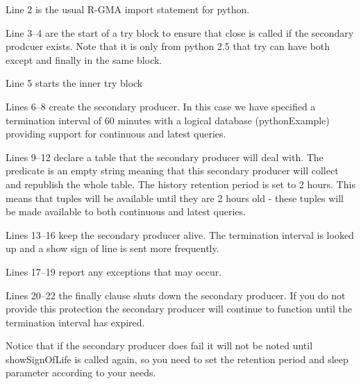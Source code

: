 Line 2 is the usual R-GMA import statement for python.

Line 3--4 are the start of a try block to ensure that close is called if the
secondary prodcuer exists. Note that it is only from python 2.5 that try
can have both except and finally in the same block.

Line 5 starts the inner try block

Lines 6--8 create the secondary producer. In
this case we have specified a termination interval of 60 minutes with 
a logical database (pythonExample) providing support for continuous and latest
queries.

Lines 9--12 declare a table that the secondary producer will deal
with. The predicate is an empty string meaning that this
secondary producer will collect and republish the whole table. The
history retention period is set to 2 hours. This means that tuples
will be available until they are 2 hours old - these tuples will be
made available to both continuous and latest queries.

Lines 13--16 keep the secondary producer alive. The termination interval is
looked up and a show sign of line is sent more frequently.

Lines 17--19 report any exceptions that may occur.

Lines 20--22 the finally clause shuts down the secondary producer. If
you do not provide this protection the secondary producer will
continue to function until the termination interval has expired.

Notice that if the secondary producer does fail it will not be noted until
showSignOfLife is called again, so you need to set the retention period 
and sleep parameter according to your needs.


